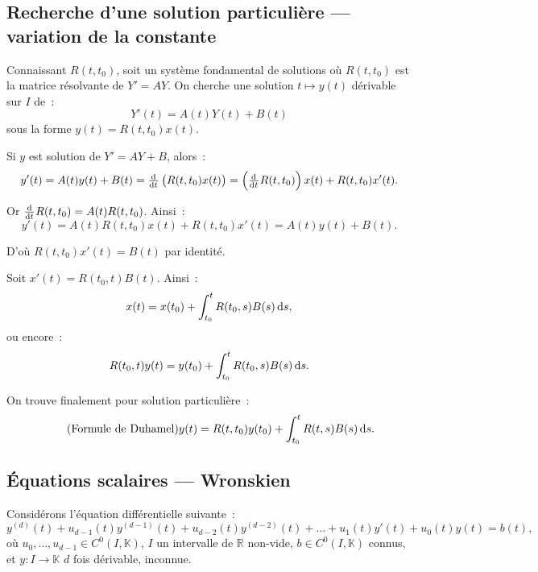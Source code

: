 \documentclass{report}
\theoremstyle{definition}
\theoremstyle{remark}
\numberwithin{equation}{section}
\newcommand{\K}{\mathbb K}
\newcommand{\R}{\mathbb R}
\begin{document}
		\subsection{Recherche d'une solution particulière --- variation de la constante}
			Connaissant $R(t, t_0)$, soit un système fondamental de solutions où $R(t, t_0)$ est la matrice résolvante de $Y'= AY$. On cherche une solution
			$t \mapsto y(t)$ dérivable sur $I$ de~:
			\begin{equation}
				Y'(t) = A(t)Y(t) + B(t)
			\end{equation}
			sous la forme $y(t) = R(t, t_0)x(t)$.

			Si $y$ est solution de $Y' = AY + B$, alors~:
			\begin{equation}
				y'(t) = A(t)y(t) + B(t) = \od{}t \left(R(t, t_0)x(t)\right) = \left(\od{}t R(t, t_0)\right)x(t) + R(t, t_0)x'(t).
			\end{equation}

			Or $\od{}t R(t, t_0) = A(t)R(t, t_0)$. Ainsi~:
			\begin{equation}
				y'(t) = A(t)R(t, t_0)x(t) + R(t, t_0)x'(t) = A(t)y(t) + B(t).
			\end{equation}

			D'où $R(t, t_0)x'(t) = B(t)$ par identité.

			Soit $x'(t) = R(t_0, t)B(t)$. Ainsi~:
			\begin{equation}
				x(t) = x(t_0) + \int_{t_0}^tR(t_0, s)B(s)\dif s,
			\end{equation}
			ou encore~:
			\begin{equation}
				R(t_0, t)y(t) = y(t_0) + \int_{t_0}^tR(t_0, s)B(s)\dif s.
			\end{equation}

			On trouve finalement pour solution particulière~:
			\begin{align}\tag{Formule de Duhamel}
				y(t) = R(t, t_0)y(t_0) + \int_{t_0}^tR(t, s)B(s)\dif s.
			\end{align}

		\subsection{Équations scalaires --- Wronskien}
			Considérons l'équation différentielle suivante~:
			\begin{equation}
				y^{(d)}(t) + u_{d-1}(t)y^{(d-1)}(t) + u_{d-2}(t)y^{(d-2)}(t) + \ldots + u_1(t)y'(t) + u_0(t)y(t) = b(t),
			\end{equation}
			où $u_0, \ldots, u_{d-1} \in C^0(I, \K)$, $I$ un intervalle de $\R$ non-vide, $b \in C^0(I, \K)$ connus, et $y : I \to \K$ $d$ fois dérivable, inconnue.
\end{document}
